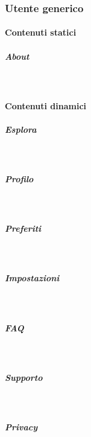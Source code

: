 \subsubsection{Utente generico}
\paragraph{Contenuti statici}
\subparagraph{About}

~\\

\paragraph{Contenuti dinamici}   %
\subparagraph{Esplora}

~\\
\subparagraph{Profilo}

~\\
\subparagraph{Preferiti}

~\\
\subparagraph{Impostazioni} 

~\\
\subparagraph{FAQ} 

~\\
\subparagraph{Supporto} 

~\\
\subparagraph{Privacy} 

~\\














